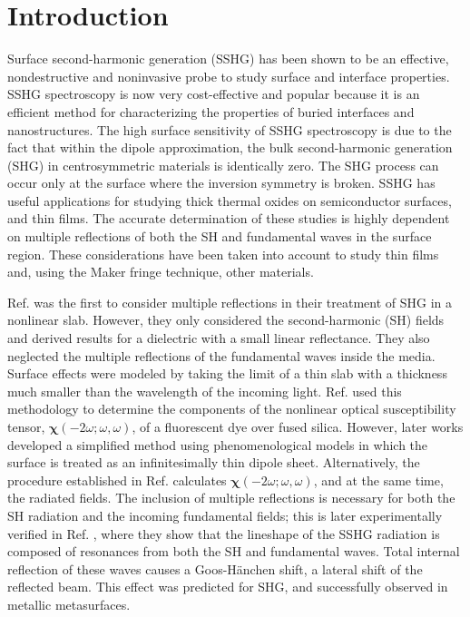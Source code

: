 \documentclass[aps,prb,10pt,showpacs,letterpaper,twocolumn]{revtex4-1}
\begin{document}
\section{Introduction}\label{sec:intro}

Surface second-harmonic generation (SSHG) has been shown to be an effective,
nondestructive and noninvasive probe to study surface and interface
properties.\cite{chenPRL81, shenNAT89, mcgilpOE94, bloembergenAPB99,
mcgilpSRL99, lupkeSSR99, downerPSSA01, downerSIA01} SSHG spectroscopy is now
very cost-effective and popular because it is an efficient method for
characterizing the properties of buried interfaces and nanostructures. The high
surface sensitivity of SSHG spectroscopy is due to the fact that within the
dipole approximation, the bulk second-harmonic generation (SHG) in
centrosymmetric materials is identically zero. The SHG process can occur only at
the surface where the inversion symmetry is broken. SSHG has useful applications
for studying thick thermal oxides on semiconductor
surfaces,\cite{vanhasseltJOSAB95, kolthammerPRB05} and thin
films.\cite{yeganehPRB92} The accurate determination of these studies is highly
dependent on multiple reflections of both the SH and fundamental waves in the
surface region. These considerations have been taken into account to study thin
films\cite{haseAPL92, buinitskayaMJPS02, buinitskayaCAS03} and, using the Maker
fringe technique,\cite{makerPRL62} other materials.\cite{tellierOC07,
abeJOSAB08}

Ref.  was the first to 
{\color{red}
consider multiple reflections in their treatment of SHG in a nonlinear slab.
However, they only considered the second-harmonic (SH) fields and derived
results for a dielectric with a small linear reflectance. They also neglected
the multiple reflections of the fundamental waves inside the media.
}
Surface effects were modeled by
taking the limit of a thin slab with a thickness much smaller than the
wavelength of the incoming light. Ref.  used this
methodology to determine the components of the nonlinear optical susceptibility
tensor, $\boldsymbol{\chi}(-2\omega;\omega,\omega)$, of a fluorescent dye over
fused silica. However, later works\cite{sipePRB87, mizrahiJOSA88} developed a
simplified method using phenomenological models in which the surface is treated
as an infinitesimally thin dipole sheet. Alternatively, the procedure
established in Ref.  calculates
$\boldsymbol{\chi}(-2\omega;\omega,\omega)$, and at the same time, the radiated
fields. The inclusion of multiple reflections is necessary for both the SH
radiation and the incoming fundamental fields; this is later experimentally
verified in Ref. , where they show that the lineshape
of the SSHG radiation is composed of resonances from both the SH and fundamental
waves.
{\color{red}
Total internal reflection of these waves causes a Goos-H\"anchen shift,
\cite{goosAP47} a lateral shift of the reflected beam. This effect was predicted
for SHG,\cite{shihPRA71, yallapragadaSR16} and successfully observed in metallic
metasurfaces.\cite{yallapragadaOE13}
}
\end{document}
